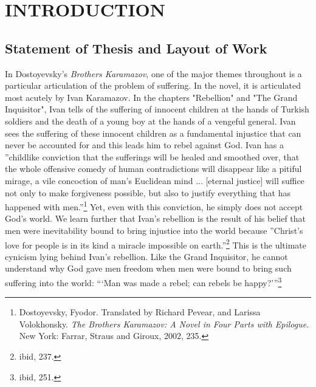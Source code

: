\tableofcontents
\chapter{INTRODUCTION}

\pagestyle{myheadings}

\label{introduction}

\section{Statement of Thesis and Layout of Work}

In Dostoyevsky's \emph{Brothers Karamazov}, one of the major themes throughout is a particular articulation of the problem of suffering. In the novel, it is articulated most acutely by Ivan Karamazov. In the chapters "Rebellion" and "The Grand Inquisitor", Ivan tells of the suffering of innocent children at the hands of Turkish soldiers and the death of a young boy at the hands of a vengeful general. Ivan sees the suffering of these innocent children as a fundamental injustice that can never be accounted for and this leads him to rebel against God. Ivan has a ''childlike conviction that the sufferings will be healed and smoothed over, that the whole offensive comedy of human contradictions will disappear like a pitiful mirage, a vile concoction of man's Euclidean mind ... [eternal justice] will suffice not only to make forgiveness possible, but also to justify everything that has happened with men.''\footnote{Dostoyevsky, Fyodor. Translated by Richard Pevear, and Larissa Volokhonsky. \emph{The Brothers Karamazov: A Novel in Four Parts with Epilogue}. New York: Farrar, Straus and Giroux, 2002, 235.} Yet, even with this conviction, he simply does not accept God's world. We learn further that Ivan's rebellion is the result of his belief that men were inevitability bound to bring injustice into the world because ''Christ's love for people is in its kind a miracle impossible on earth.''\footnote{ibid, 237.} This is the ultimate cynicism lying behind Ivan's rebellion. Like the Grand Inquisitor, he cannot understand why God gave men freedom when men were bound to bring such suffering into the world: ```Man was made a rebel; can rebels be happy?'''\footnote{ibid, 251.}

